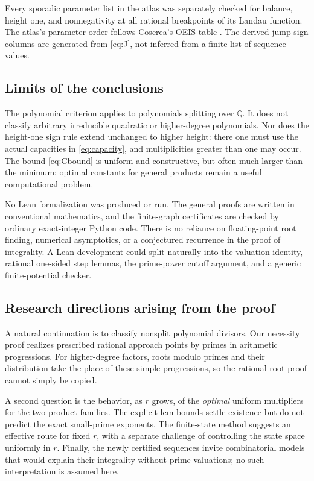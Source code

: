 \documentclass[11pt]{article}
\theoremstyle{definition}
\theoremstyle{remark}
\newcommand{\Q}{\mathbb Q}
\begin{document}
Every sporadic parameter list in the atlas was separately checked for
balance, height one, and nonnegativity at all rational breakpoints of
its Landau function. The atlas's parameter order follows Coserea's
OEIS table \cite{coserea}. The derived jump-sign columns are generated
from \eqref{eq:J}, not inferred from a finite list of sequence values.

\subsection{Limits of the conclusions}
The polynomial criterion applies to polynomials splitting over $\Q$.
It does not classify arbitrary irreducible quadratic or higher-degree
polynomials. Nor does the height-one sign rule extend unchanged to
higher height: there one must use the actual capacities in
\eqref{eq:capacity}, and multiplicities greater than one may occur.
The bound \eqref{eq:Cbound} is uniform and constructive, but often much
larger than the minimum; optimal constants for general products remain
a useful computational problem.

No Lean formalization was produced or run. The general proofs are
written in conventional mathematics, and the finite-graph certificates
are checked by ordinary exact-integer Python code. There is no reliance
on floating-point root finding, numerical asymptotics, or a conjectured
recurrence in the proof of integrality. A Lean development could split
naturally into the valuation identity, rational one-sided step lemmas,
the prime-power cutoff argument, and a generic finite-potential checker.

\subsection{Research directions arising from the proof}\label{ffd:partI:directions}
A natural continuation is to classify nonsplit polynomial divisors.
Our necessity proof realizes prescribed rational approach points by
primes in arithmetic progressions. For higher-degree factors, roots
modulo primes and their distribution take the place of these simple
progressions, so the rational-root proof cannot simply be copied.

A second question is the behavior, as $r$ grows, of the \emph{optimal}
uniform multipliers for the two product families. The explicit lcm
bounds settle existence but do not predict the exact small-prime
exponents. The finite-state method suggests an effective route for
fixed $r$, with a separate challenge of controlling the state space
uniformly in $r$. Finally, the newly certified sequences invite
combinatorial models that would explain their integrality without
prime valuations; no such interpretation is assumed here.
\end{document}
